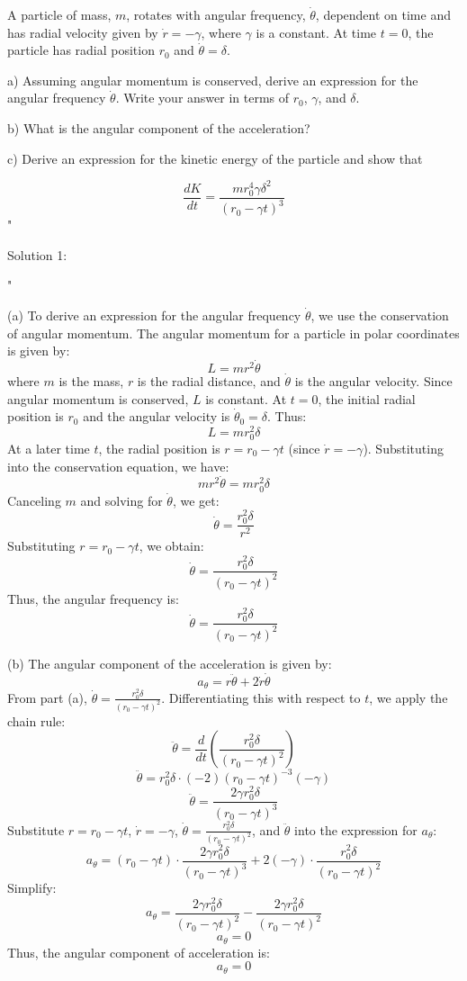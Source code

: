A particle of mass, \( m \), rotates with angular frequency, \( \dot{\theta} \), dependent on time and has radial velocity given by \( \dot{r} = - \gamma \), where \( \gamma \) is a constant. At time \( t = 0 \), the particle has radial position \( r_{0} \) and \( \dot{\theta} = \delta \). 
    
a) Assuming angular momentum is conserved, derive an expression for the angular frequency \( \dot{\theta} \). Write your answer in terms of \( r_{0} \), \( \gamma \), and \( \delta \).
    
b) What is the angular component of the acceleration?
    
c) Derive an expression for the kinetic energy of the particle and show that 
    
\[
\frac{dK}{dt} = \frac{m r_{0}^{4} \gamma \delta^{2}}{(r_{0} - \gamma t)^{3}}
\]"

Solution 1: 

"

(a) To derive an expression for the angular frequency \( \dot{\theta} \), we use the conservation of angular momentum. The angular momentum for a particle in polar coordinates is given by:
\[
L = m r^2 \dot{\theta}
\]
where \( m \) is the mass, \( r \) is the radial distance, and \( \dot{\theta} \) is the angular velocity. Since angular momentum is conserved, \( L \) is constant. At \( t = 0 \), the initial radial position is \( r_0 \) and the angular velocity is \( \dot{\theta}_0 = \delta \). Thus:
\[
L = m r_0^2 \delta
\]
At a later time \( t \), the radial position is \( r = r_0 - \gamma t \) (since \( \dot{r} = -\gamma \)). Substituting into the conservation equation, we have:
\[
m r^2 \dot{\theta} = m r_0^2 \delta
\]
Canceling \( m \) and solving for \( \dot{\theta} \), we get:
\[
\dot{\theta} = \frac{r_0^2 \delta}{r^2}
\]
Substituting \( r = r_0 - \gamma t \), we obtain:
\[
\dot{\theta} = \frac{r_0^2 \delta}{(r_0 - \gamma t)^2}
\]
Thus, the angular frequency is:
\[
\boxed{\dot{\theta} = \frac{r_0^2 \delta}{(r_0 - \gamma t)^2}}
\]

(b) The angular component of the acceleration is given by:
\[
a_\theta = r \ddot{\theta} + 2 \dot{r} \dot{\theta}
\]
From part (a), \( \dot{\theta} = \frac{r_0^2 \delta}{(r_0 - \gamma t)^2} \). Differentiating this with respect to \( t \), we apply the chain rule:
\[
\ddot{\theta} = \frac{d}{dt} \left( \frac{r_0^2 \delta}{(r_0 - \gamma t)^2} \right)
\]
\[
\ddot{\theta} = r_0^2 \delta \cdot (-2) (r_0 - \gamma t)^{-3} (-\gamma)
\]
\[
\ddot{\theta} = \frac{2 \gamma r_0^2 \delta}{(r_0 - \gamma t)^3}
\]
Substitute \( r = r_0 - \gamma t \), \( \dot{r} = -\gamma \), \( \dot{\theta} = \frac{r_0^2 \delta}{(r_0 - \gamma t)^2} \), and \( \ddot{\theta} \) into the expression for \( a_\theta \):
\[
a_\theta = (r_0 - \gamma t) \cdot \frac{2 \gamma r_0^2 \delta}{(r_0 - \gamma t)^3} + 2 (-\gamma) \cdot \frac{r_0^2 \delta}{(r_0 - \gamma t)^2}
\]
Simplify:
\[
a_\theta = \frac{2 \gamma r_0^2 \delta}{(r_0 - \gamma t)^2} - \frac{2 \gamma r_0^2 \delta}{(r_0 - \gamma t)^2}
\]
\[
a_\theta = 0
\]
Thus, the angular component of acceleration is:
\[
\boxed{a_\theta = 0}
\]

